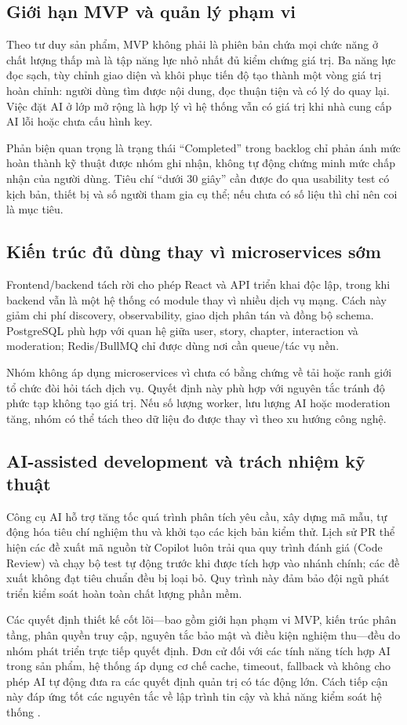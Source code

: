 \subsection{Giới hạn MVP và quản lý phạm vi}

Theo tư duy sản phẩm, MVP không phải là phiên bản chứa mọi chức năng ở chất lượng thấp mà là tập năng lực nhỏ nhất đủ kiểm chứng giá trị. Ba năng lực đọc sạch, tùy chỉnh giao diện và khôi phục tiến độ tạo thành một vòng giá trị hoàn chỉnh: người dùng tìm được nội dung, đọc thuận tiện và có lý do quay lại. Việc đặt AI ở lớp mở rộng là hợp lý vì hệ thống vẫn có giá trị khi nhà cung cấp AI lỗi hoặc chưa cấu hình key.

Phản biện quan trọng là trạng thái ``Completed'' trong backlog chỉ phản ánh mức hoàn thành kỹ thuật được nhóm ghi nhận, không tự động chứng minh mức chấp nhận của người dùng. Tiêu chí ``dưới 30 giây'' cần được đo qua usability test có kịch bản, thiết bị và số người tham gia cụ thể; nếu chưa có số liệu thì chỉ nên coi là mục tiêu.

\subsection{Kiến trúc đủ dùng thay vì microservices sớm}

Frontend/backend tách rời cho phép React và API triển khai độc lập, trong khi backend vẫn là một hệ thống có module thay vì nhiều dịch vụ mạng. Cách này giảm chi phí discovery, observability, giao dịch phân tán và đồng bộ schema. PostgreSQL phù hợp với quan hệ giữa user, story, chapter, interaction và moderation; Redis/BullMQ chỉ được dùng nơi cần queue/tác vụ nền.

Nhóm không áp dụng microservices vì chưa có bằng chứng về tải hoặc ranh giới tổ chức đòi hỏi tách dịch vụ. Quyết định này phù hợp với nguyên tắc tránh độ phức tạp không tạo giá trị. Nếu số lượng worker, lưu lượng AI hoặc moderation tăng, nhóm có thể tách theo dữ liệu đo được thay vì theo xu hướng công nghệ.

\clearpage
\subsection{AI-assisted development và trách nhiệm kỹ thuật}

Công cụ AI hỗ trợ tăng tốc quá trình phân tích yêu cầu, xây dựng mã mẫu, tự động hóa tiêu chí nghiệm thu và khởi tạo các kịch bản kiểm thử. Lịch sử PR thể hiện các đề xuất mã nguồn từ Copilot luôn trải qua quy trình đánh giá (Code Review) và chạy bộ test tự động trước khi được tích hợp vào nhánh chính; các đề xuất không đạt tiêu chuẩn đều bị loại bỏ. Quy trình này đảm bảo đội ngũ phát triển kiểm soát hoàn toàn chất lượng phần mềm.

Các quyết định thiết kế cốt lõi—bao gồm giới hạn phạm vi MVP, kiến trúc phân tầng, phân quyền truy cập, nguyên tắc bảo mật và điều kiện nghiệm thu—đều do nhóm phát triển trực tiếp quyết định. Đơn cử đối với các tính năng tích hợp AI trong sản phẩm, hệ thống áp dụng cơ chế cache, timeout, fallback và không cho phép AI tự động đưa ra các quyết định quản trị có tác động lớn. Cách tiếp cận này đáp ứng tốt các nguyên tắc về lập trình tin cậy và khả năng kiểm soát hệ thống \cite{sommerville-se10,pressman9}.

